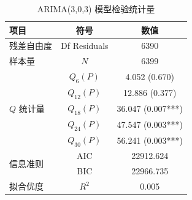 \begin{table}[htbp]
\centering
\caption{ARIMA(3,0,3) 模型检验统计量}
\label{tab:arima_diagnostics}
\begin{tabular}{l c c}
\toprule
项目 & 符号 & 数值 \\
\midrule
残差自由度 & Df Residuals & 6390 \\
样本量 & $N$ & 6399 \\
\multirow{5}{*}{$Q$ 统计量} & $Q_{6}(P)$ & 4.052 (0.670) \\
 & $Q_{12}(P)$ & 12.886 (0.377) \\
 & $Q_{18}(P)$ & 36.047 (0.007***) \\
 & $Q_{24}(P)$ & 47.547 (0.003***) \\
 & $Q_{30}(P)$ & 56.241 (0.003***) \\
\multirow{2}{*}{信息准则} & AIC & 22912.624 \\
 & BIC & 22966.735 \\
拟合优度 & $R^2$ & 0.005 \\
\bottomrule
\end{tabular}
\end{table}
